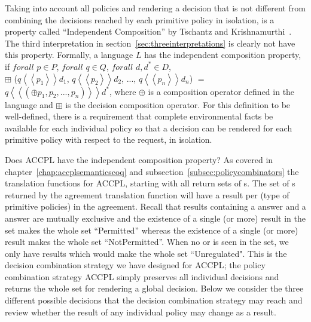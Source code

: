 Taking into account all policies and rendering a decision that is not different from combining the decisions reached by each primitive policy in isolation, is a property called ``Independent Composition'' by Tschantz and Krishnamurthi~\cite{Tschantz}. The third interpretation in section~\ref{sec:threeinterpretations} is clearly not have this property. Formally, a language $L$ has the independent composition property, if $forall$ $p \in P$, $forall$ $q \in Q$, $forall$ $d, d^\ast \in D$, \\$\boxplus$ ($q \left\langle\left\langle p_{1}  \right\rangle\right\rangle d_{1}$, $q \left\langle\left\langle p_{2}  \right\rangle\right\rangle d_{2}$, ..., $q \left\langle\left\langle p_{n}  \right\rangle\right\rangle d_{n}$) $=$ $q \left\langle\left\langle (\oplus p_{1}, p_{2}, ..., p_{n}) \right\rangle\right\rangle d^\ast$, where $\oplus$ is a composition operator defined in the language and $\boxplus$ is the decision composition operator. For this definition to be well-defined, there is a requirement that complete environmental facts be available for each individual policy so that a decision can be rendered for each primitive policy with respect to the request, in isolation.

Does \ac{ACCPL} have the independent composition property? As covered in chapter~\ref{chap:accplsemanticscoq} and subsection~\ref{subsec:policycombinators} the translation functions for \ac{ACCPL}, starting with  all return sets of s.  The set of s returned by the agreement translation function will have a result per  (type of primitive policies) in the agreement. Recall that results containing a  answer and a  answer are mutually exclusive and the existence of a single (or more)  result in the set makes the whole set ``Permitted'' whereas the existence of a single (or more)  result makes the whole set ``NotPermitted''. When no  or  is seen in the set, we only have  results which would make the whole set ``Unregulated". This is the decision combination strategy we have designed for \ac{ACCPL}; the policy combination strategy \ac{ACCPL} simply preserves all individual decisions and returns the whole set for rendering a global decision. Below we consider the three different possible decisions that the decision combination strategy may reach and review whether the result of any individual policy may change as a result.

